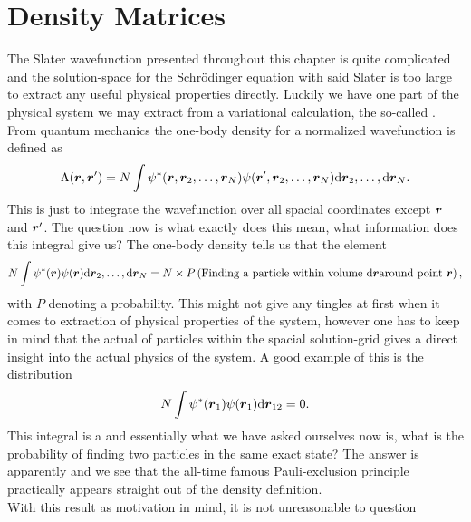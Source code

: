 \section{Density Matrices}
    The Slater wavefunction presented throughout this chapter is quite
    complicated and the solution-space for the Schrödinger equation with said
    Slater is too large to extract any useful physical properties directly.
    Luckily we have one part of the physical system we may extract from a
    variational calculation, the so-called . From
    quantum mechanics the one-body density for a normalized wavefunction is
    defined as
        \begin{equation}
            \Lambda(\boldsymbol{{r}},\boldsymbol{{r}}') = N\int
            \psi^{*}(\boldsymbol{{r}},\boldsymbol{{r}}_2,\dots,\boldsymbol{{r}}_N)
            \psi(\boldsymbol{{r}}',\boldsymbol{{r}}_2,\dots,\boldsymbol{{r}}_N)\mathrm{d}\boldsymbol{{r}}_2,\dots,\mathrm{d}\boldsymbol{{r}}_N.
        \end{equation}
    This is just to integrate the wavefunction over all spacial coordinates
    except $\boldsymbol{{r}}$ and $\boldsymbol{{r}}'$. The question now is what exactly does
    this mean, what information does this integral give us? The one-body
    density tells us that the element
        \begin{equation}
            N\int
            \psi^{*}(\boldsymbol{{r}})\psi(\boldsymbol{{r}})\mathrm{d}\boldsymbol{{r}}_2,\dots,\mathrm{d}\boldsymbol{{r}}_N =
            N\times P\left(\text{Finding a particle within volume } \mathrm{d}\boldsymbol{{r}}
            \text{around point } \boldsymbol{{r}}\right),
        \end{equation}
    with $P$ denoting a probability. This might not give any tingles at first
    when it comes to extraction of physical properties of the system, however
    one has to keep in mind that the actual  of particles
    within the spacial solution-grid gives a direct insight into the actual
    physics of the system. A good example of this is the distribution
        \begin{equation}
            N\int \psi^{*}(\boldsymbol{{r}}_1)\psi(\boldsymbol{{r}}_1)\mathrm{d}\boldsymbol{{r}}_{12} = 0.
        \end{equation}
    This integral is a  and essentially what we have
    asked ourselves now is, what is the probability of finding two particles in
    the same exact state? The answer is apparently  and we see that
    the all-time famous Pauli-exclusion principle practically appears straight
    out of the density definition. \\
    With this result as motivation in mind, it is not unreasonable to question
